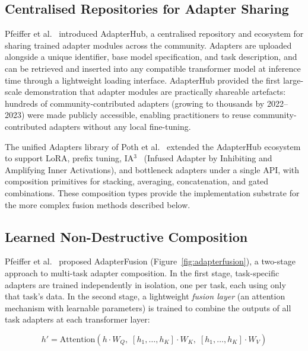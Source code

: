 \subsection{Centralised Repositories for Adapter Sharing}
\label{sec:adapter_composition:hub}

Pfeiffer et al.~\cite{Pfeiffer2020hub} introduced AdapterHub, a centralised repository and ecosystem for
sharing trained adapter modules across the community. Adapters are uploaded alongside a
unique identifier, base model specification, and task description, and can be retrieved
and inserted into any compatible transformer model at inference time through a
lightweight loading interface. AdapterHub provided the first large-scale demonstration
that adapter modules are practically shareable artefacts: hundreds of community-contributed
adapters (growing to thousands by 2022--2023) were made publicly accessible, enabling practitioners to
reuse community-contributed adapters without any local fine-tuning.

The unified Adapters library of Poth et al.~\cite{PothAdapters2023} extended the AdapterHub
ecosystem to support LoRA, prefix tuning, IA$^3$~\cite{LiuIA3_2022} (Infused Adapter by
Inhibiting and Amplifying Inner Activations), and bottleneck adapters under a single
API, with composition primitives for stacking, averaging, concatenation, and gated
combinations. These composition types provide the implementation substrate for the
more complex fusion methods described below.

\subsection{Learned Non-Destructive Composition}
\label{sec:adapter_composition:fusion}

Pfeiffer et al.~\cite{Pfeiffer2021fusion} proposed AdapterFusion (Figure~\ref{fig:adapterfusion}), a two-stage approach to multi-task
adapter composition. In the first stage, task-specific adapters are trained independently
in isolation, one per task, each using only that task's data. In the second stage,
a lightweight \textit{fusion layer} (an attention mechanism with learnable parameters) is trained to combine the outputs of all task adapters at each transformer layer:

\begin{equation}
h' = \mathrm{Attention}(h \cdot W_Q,\; [h_1, \ldots, h_K] \cdot W_K,\; [h_1, \ldots, h_K] \cdot W_V)
\label{eq:adapterfusion}
\end{equation}

